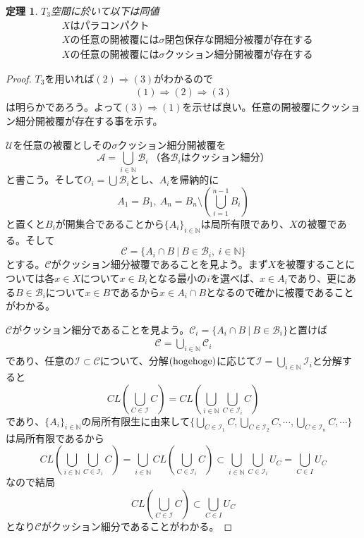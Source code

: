 \documentclass[leqno]{jsarticle}
\newtheorem{thm}{定理}
\newcommand{\To}{\Longrightarrow}
\newcommand{\nn}{\mathbb{N}}
\newcommand{\dpst}{\displaystyle}
\begin{document}
\setcounter{equation}{0}
\begin{thm}
$T_3$空間に於いて以下は同値
\begin{align}
&\mbox{$X$はパラコンパクト}\\
&\mbox{$X$の任意の開被覆には$\sigma$閉包保存な開細分被覆が存在する}\\
&\mbox{$X$の任意の開被覆には$\sigma$クッション細分開被覆が存在する}
\end{align}
\end{thm}
\begin{proof}
$T_3$を用いれば$(2)\To (3)$がわかるので
\begin{align*}
(1)\To(2)\To(3)
\end{align*}
は明らかであろう。よって$(3)\To(1)$を示せば良い。任意の開被覆にクッション細分開被覆が存在する事を示す。\par
$\mathcal{U}$を任意の被覆としその$\sigma$クッション細分開被覆を
\[
\mathcal{A}=\bigcup_{i\in \nn}\mathcal{B}_i\ \mbox{（各$\mathcal{B}_i$はクッション細分）}
\]と書こう。そして$O_i=\bigcup\mathcal{B}_i$とし、$A_i$を帰納的に
\[
A_1=B_1,\ A_n=B_n\setminus \left(\bigcup_{i=1}^{n-1}B_i\right)
\]
と置くと$B_i$が開集合であることから$\{A_i\}_{i\in \nn}$は局所有限であり、$X$の被覆である。そして
\[
\mathcal{C}=\{A_i\cap B\ |\ B\in \mathcal{B}_i,\ i\in \nn\}
\]とする。$\mathcal{C}$がクッション細分被覆であることを見よう。まず$X$を被覆することについては各$x\in X$について$x\in B_i$となる最小の$i$を選べば、$x\in A_i$であり、更にある$B\in \mathcal{B}_i$について$x\in B$であるから$x\in A_i\cap B$となるので確かに被覆であることがわかる。\par
$\mathcal{C}$がクッション細分であることを見よう。$\mathcal{C}_i=\{A_i\cap B\ |\ B\in \mathcal{B}_i\}$と置けば
\begin{align}
\mathcal{C}=\bigcup_{i\in \nn}\mathcal{C}_i\tag{hogehoge}
\end{align}
であり、任意の$\mathcal{I}\subset \mathcal{C}$について、分解$({\rm hogehoge})$に応じて$\mathcal{I}=\bigcup_{i\in \nn}\mathcal{I}_i$と分解すると
\[
CL\left(\bigcup_{C\in \mathcal{I}}C\right)=CL\left(\bigcup_{i\in \nn}\bigcup_{C\in \mathcal{I}_i}C\right)
\]
であり、$\{A_i\}_{i\in \nn}$の局所有限生に由来して$\dpst \{\bigcup_{C\in \mathcal{I}_1}C,\bigcup_{C\in \mathcal{I}_2}C,\cdots,\bigcup_{C\in \mathcal{I}_n}C,\cdots\}$は局所有限であるから
\[
CL\left(\bigcup_{i\in \nn}\bigcup_{C\in \mathcal{I}_i}C\right)=\bigcup_{i\in \nn}CL\left(\bigcup_{C\in \mathcal{I}_i}C\right)\subset \bigcup_{i\in \nn}\bigcup_{C\in \mathcal{I}_i}U_C=\bigcup_{C\in I}U_C
\]
なので結局
\[
CL\left(\bigcup_{C\in \mathcal{I}}C\right)\subset \bigcup_{C\in I}U_C
\]となり$\mathcal{C}$がクッション細分であることがわかる。
\end{proof}
\end{document}
